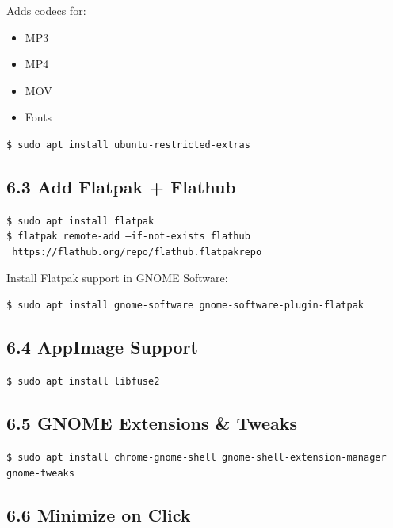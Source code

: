 \documentclass[12pt]{article}
\begin{document}
Adds codecs for:

\begin{itemize}
    \item MP3
    \item MP4
    \item MOV
    \item Fonts
\end{itemize}

\begin{highlightbox}
\texttt{\$ sudo apt install ubuntu-restricted-extras}
\end{highlightbox}

\subsection*{6.3 Add Flatpak + Flathub}

\begin{highlightbox}
\texttt{\$ sudo apt install flatpak}\\
\texttt{\$ flatpak remote-add --if-not-exists flathub}\\
\texttt{  https://flathub.org/repo/flathub.flatpakrepo}
\end{highlightbox}

Install Flatpak support in GNOME Software:

\begin{highlightbox}
\texttt{\$ sudo apt install gnome-software gnome-software-plugin-flatpak}
\end{highlightbox}

\subsection*{6.4 AppImage Support}

\begin{highlightbox}
\texttt{\$ sudo apt install libfuse2}
\end{highlightbox}

\subsection*{6.5 GNOME Extensions \& Tweaks}

\begin{highlightbox}
\texttt{\$ sudo apt install chrome-gnome-shell gnome-shell-extension-manager gnome-tweaks}
\end{highlightbox}

\subsection*{6.6 Minimize on Click}
\end{document}
